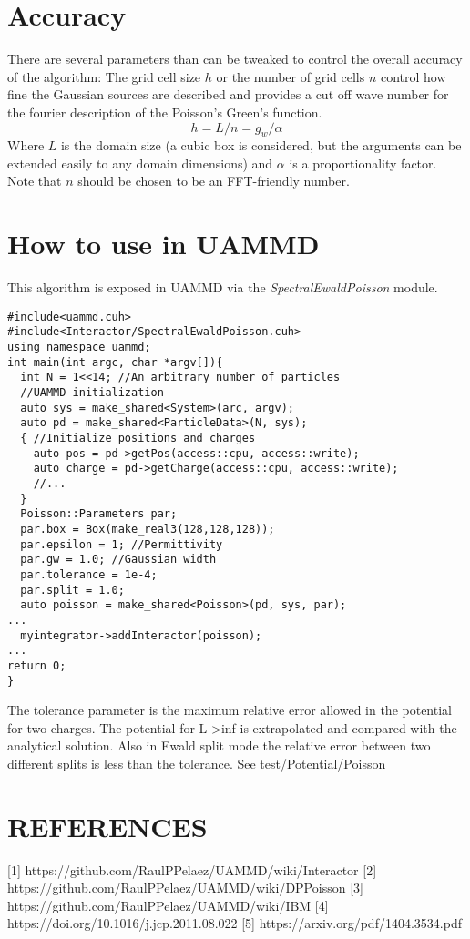 \documentclass[ twoside,openright,titlepage,numbers=noenddot,%
headinclude,footinclude,cleardoublepage=empty,abstract=on,
BCOR=5mm,paper=a4,fontsize=11pt
]{scrreprt}
\newcommand{\uammd}{\gls{UAMMD}\xspace}
\begin{document}
\section{Accuracy}
There are several parameters than can be tweaked to control the overall accuracy of the algorithm:
The grid cell size $h$ or the number of grid cells $n$ control how fine the Gaussian sources are described and provides a cut off wave number for the fourier description of the Poisson's Green's function.
\begin{equation}
h = L/n = g_w/\alpha
\end{equation}
Where $L$ is the domain size (a cubic box is considered, but the arguments can be extended easily to any domain dimensions) and $\alpha$ is a proportionality factor. Note that $n$ should be chosen to be an \gls{FFT}-friendly number.


\section{How to use in UAMMD}

This algorithm is exposed in \uammd via the \emph{SpectralEwaldPoisson} module.

\begin{verbatim}
#include<uammd.cuh>
#include<Interactor/SpectralEwaldPoisson.cuh>
using namespace uammd;
int main(int argc, char *argv[]){
  int N = 1<<14; //An arbitrary number of particles
  //UAMMD initialization
  auto sys = make_shared<System>(arc, argv);
  auto pd = make_shared<ParticleData>(N, sys);
  { //Initialize positions and charges
    auto pos = pd->getPos(access::cpu, access::write);
    auto charge = pd->getCharge(access::cpu, access::write);
    //...
  }
  Poisson::Parameters par;
  par.box = Box(make_real3(128,128,128));
  par.epsilon = 1; //Permittivity
  par.gw = 1.0; //Gaussian width
  par.tolerance = 1e-4;
  par.split = 1.0;
  auto poisson = make_shared<Poisson>(pd, sys, par);
...
  myintegrator->addInteractor(poisson);
...
return 0;
}
\end{verbatim}
The tolerance parameter is the maximum relative error allowed in the potential for two charges. The potential for L->inf is extrapolated and compared with the analytical solution. Also in Ewald split mode the relative error between two different splits is less than the tolerance. See test/Potential/Poisson  
\section{REFERENCES}
[1] https://github.com/RaulPPelaez/UAMMD/wiki/Interactor   
[2] https://github.com/RaulPPelaez/UAMMD/wiki/DPPoisson  
[3] https://github.com/RaulPPelaez/UAMMD/wiki/IBM  
[4] https://doi.org/10.1016/j.jcp.2011.08.022  
[5] https://arxiv.org/pdf/1404.3534.pdf  
\newpage
\cleardoublepage
{}
\end{document}
